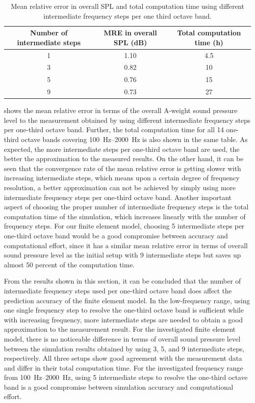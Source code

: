 \begin{table}
	\caption{Mean relative error in overall SPL and total computation time using different intermediate frequency steps per one third octave band.}
	\label{tab:freq_steps_MRE}
	\centering
	\begin{tabular}{ccc}
		\toprule
		Number of intermediate steps & MRE in overall SPL (dB) & Total computation time (h) \\ 
		\midrule
		1  & 1.10 & 4.5 \\ 
		3  & 0.82 & 10 \\
		5  & 0.76 & 15 \\
		9  & 0.73 & 27 \\
		\bottomrule
	\end{tabular}
\end{table}

 shows the mean relative error in terms of the overall A-weight sound pressure level to the measurement obtained by using different intermediate frequency steps per one-third octave band. Further, the total computation time for all 14 one-third octave bands covering \SIrange{100}{2000}{\hertz} is also shown in the same table. As expected, the more intermediate steps per one-third octave band are used, the better the approximation to the measured results. On the other hand, it can be seen that the convergence rate of the mean relative error is getting slower with increasing intermediate steps, which means upon a certain degree of frequency resolution, a better approximation can not be achieved by simply using more intermediate frequency steps per one-third octave band. Another important aspect of choosing the proper number of intermediate frequency steps is the total computation time of the simulation, which increases linearly with the number of frequency steps. For our finite element model, choosing 5 intermediate steps per one-third octave band would be a good compromise between accuracy and computational effort, since it has a similar mean relative error in terms of overall sound pressure level as the initial setup with 9 intermediate steps but saves up almost 50 percent of the computation time.

From the results shown in this section, it can be concluded that the number of intermediate frequency steps used per one-third octave band does affect the prediction accuracy of the finite element model. In the low-frequency range, using one single frequency step to resolve the one-third octave band is sufficient while with increasing frequency, more intermediate steps are needed to obtain a good approximation to the measurement result. For the investigated finite element model, there is no noticeable difference in terms of overall sound pressure level between the simulation results obtained by using 3, 5, and 9 intermediate steps, respectively. All three setups show good agreement with the measurement data and differ in their total computation time. For the investigated frequency range from \SIrange{100}{2000}{\hertz}, using 5 intermediate steps to resolve the one-third octave band is a good compromise between simulation accuracy and computational effort.